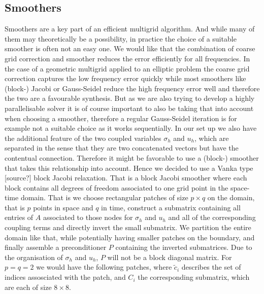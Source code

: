 \documentclass[../draft_1.tex]{subfiles}
\begin{document}
\FloatBarrier
\subsection{Smoothers}
Smoothers are a key part of an efficient multigrid algorithm. And while many of them may theoretically be a possibility, in practice the choice of a suitable smoother is often not an easy one. We would like that the combination of coarse grid correction and smoother reduces the error efficiently for all frequencies. In the case of a geometric multigrid applied to an elliptic problem the coarse grid correction captures the low frequency error quickly while most smoothers like (block-) Jacobi or Gauss-Seidel reduce the high frequency error well and therefore the two are a favourable synthesis. But as we are also trying to develop a highly parallelisable solver it is of course important to also be taking that into account when choosing a smoother, therefore a regular Gauss-Seidel iteration is for example not a suitable choice as it works sequentially. In our set up we also have the additional feature of the two coupled variables $\sigma_h$ and $u_h$, which are separated in the sense that they are two concatenated vectors but have the contentual connection. Therefore it might be favorable to use a (block-) smoother that takes this relationship into account. Hence we decided to use a Vanka type [source?] block Jacobi relaxation. That is a block Jacobi smoother where each block contains all degrees of freedom associated to one grid point in the space-time domain. That is we choose rectangular patches of size $p \times q$ on the domain, that is $p$ points in space and $q$ in time, construct a submatrix containing all entries of $A$ associated to those nodes for $\sigma_h$ and $u_h$ and all of the corresponding coupling terms and directly invert the small submatrix. We partition the entire domain like that, while potentially having smaller patches on the boundary, and finally assemble a preconditioner $P$ containing the inverted submatrices. Due to the organisation of $\sigma_h$ and $u_h$, $P$ will not be a block diagonal matrix. For $p = q = 2 $ we would have the following patches, where $\tilde{c}_i$ describes the set of indices assosciated with the patch, and $C_i$ the corresponding submatrix, which are each of size $8 \times 8$. 
\end{document}
